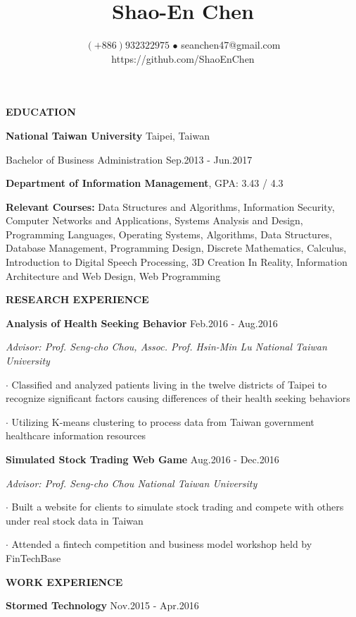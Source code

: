 \documentclass[12pt]{article}
\title{\vspace{-1in}Shao-En Chen}
\author{
	$(\texttt{+}886) 932322975$ $\bullet$ seanchen47@gmail.com
	\\https://github.com/ShaoEnChen
}
\date{}
\begin{document}
\maketitle

\textbf{\large{\uppercase{Education}}}
\hrulefill{}

\textbf{National Taiwan University} \hfill{Taipei, Taiwan}

Bachelor of Business Administration \hfill{Sep.2013 - Jun.2017}

\textbf{Department of Information Management}, GPA: 3.43 / 4.3

\textbf{Relevant Courses: }
Data Structures and Algorithms, Information Security, Computer Networks and Applications, Systems Analysis and Design, Programming Languages, Operating Systems, Algorithms, Data Structures, Database Management, Programming Design, Discrete Mathematics, Calculus, Introduction to Digital Speech Processing, 3D Creation In Reality, Information Architecture and Web Design, Web Programming

\vspace{0.5em}

\textbf{\large{\uppercase{Research Experience}}}
\hrulefill{}

\textbf{Analysis of Health Seeking Behavior} \hfill{Feb.2016 - Aug.2016}

\textit{Advisor: Prof. Seng-cho Chou, Assoc. Prof. Hsin-Min Lu \hfill{National Taiwan University}}

$\cdot$ Classified and analyzed patients living in the twelve districts of Taipei to recognize significant factors causing differences of their health seeking behaviors

$\cdot$ Utilizing K-means clustering to process data from Taiwan government healthcare information resources

\textbf{Simulated Stock Trading Web Game} \hfill{Aug.2016 - Dec.2016}

\textit{Advisor: Prof. Seng-cho Chou \hfill{National Taiwan University}}

$\cdot$ Built a website for clients to simulate stock trading and compete with others under real stock data in Taiwan

$\cdot$ Attended a fintech competition and business model workshop held by FinTechBase

\vspace{0.5em}

\textbf{\large{\uppercase{Work Experience}}}
\hrulefill{}

\textbf{Stormed Technology} \hfill{Nov.2015 - Apr.2016}
\end{document}
